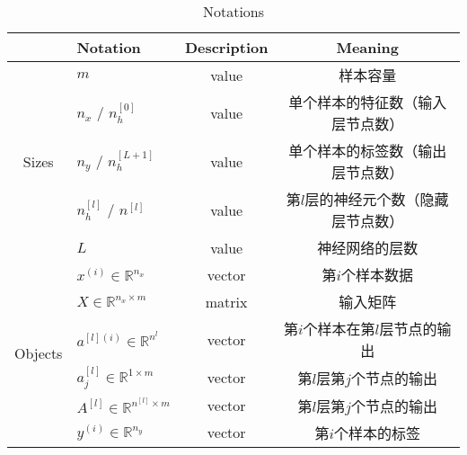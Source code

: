 \begin{table}[ht]
	\centering
	\begin{threeparttable}
	\caption{Notations}
	\begin{tabular}{clcc}
		\hline
									& \textbf{Notation}                                     & \textbf{Description} & \textbf{Meaning}                                                   \\ \hline
		\multirow{5}{*}{Sizes}      & $m$                                                   & value                & 样本容量                                                               \\
									& $n_x$ / $n_h^{[0]}$                                   & value                & 单个样本的特征数（输入层节点数）                                         \\
									& $n_y$ / $n_h^{[L+1]}$                                 & value                & 单个样本的标签数（输出层节点数）                                      \\
									& $n_h^{[l]}$ / $n^{[l]}$                               & value                & 第$l$层的神经元个数（隐藏层节点数）                                   \\
									& $L$                                                   & value                & 神经网络的层数                                                         \\ \hline
		\multirow{11}{*}{Objects}   & $x^{(i)} \in \mathbb{R}^{n_x}$                        & vector               & 第$i$个样本数据                                                          \\
									& $X \in {\mathbb{R}^{n_x \times m}}$                   & matrix               & 输入矩阵                                                               \\
									& $a^{[l](i)} \in \mathbb{R}^{n^{l}}$                   & vector               & 第$i$个样本在第$l$层节点的输出                                                  \\
									& $a_j^{[l]} \in \mathbb{R}^{1 \times {m}}$             & vector               & 第$l$层第$j$个节点的输出                                                         \\
									& $A^{[l]} \in \mathbb{R}^{n^{[l]} \times {m}}$         & vector               & 第$l$层第$j$个节点的输出                                                         \\
									& $y^{(i)} \in \mathbb{R}^{n_y}$                        & vector               & 第$i$个样本的标签                                                         \\

\end{tabular}
\end{threeparttable}
\end{table}
